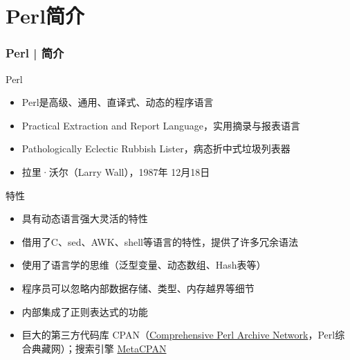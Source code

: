 \section{Perl简介}
\begin{frame}
  \frametitle{Perl | 简介}
  \begin{block}{Perl}
    \begin{itemize}
      \item Perl是高级、通用、直译式、动态的程序语言
      \item \alert{Practical Extraction and Report Language}，实用摘录与报表语言
      \item Pathologically Eclectic Rubbish Lister，病态折中式垃圾列表器
      \item 拉里·沃尔（\alert{Larry Wall}），\alert{1987年} 12月18日
    \end{itemize}
  \end{block}
  \pause
  \begin{block}{特性}
    \begin{itemize}
      \item 具有动态语言强大灵活的特性
      \item 借用了C、sed、AWK、shell等语言的特性，提供了许多冗余语法
      \item 使用了语言学的思维（泛型变量、动态数组、Hash表等）
      \item 程序员可以忽略内部数据存储、类型、内存越界等细节
      \item 内部集成了正则表达式的功能
      \item 巨大的第三方代码库 \alert{CPAN}（\href{http://www.cpan.org/}{Comprehensive Perl Archive Network}，Perl综合典藏网）；搜索引擎 \href{https://metacpan.org/}{MetaCPAN}
    \end{itemize}
  \end{block}
\end{frame}

